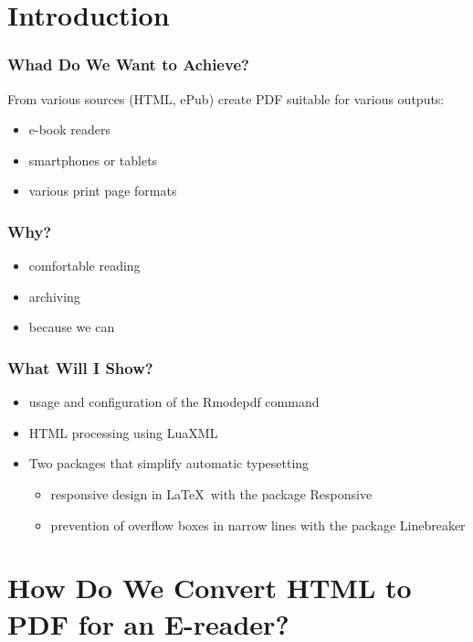\mode*
\section{Introduction}
\frenchspacing

\begin{frame}
  \frametitle{Whad Do We Want to Achieve?}
    From various sources (HTML, ePub) create PDF suitable for various outputs:
    \begin{itemize} 
      \item e-book readers
      \item smartphones or tablets
      \item various print page formats
    \end{itemize}

  \end{frame}
  \begin{frame}
    \frametitle{Why?}

    \begin{itemize}
      \item comfortable reading
      \item archiving
      \item because we can
    \end{itemize}


\end{frame}

\begin{frame}[fragile]
  \frametitle{What Will I Show?}
  \begin{itemize}
    \item usage and configuration of the Rmodepdf command
    \item HTML processing using LuaXML
    \item Two packages that simplify automatic typesetting
      \begin{itemize}
        \item responsive design in \LaTeX\ with the package Responsive
        \item prevention of overflow boxes in narrow lines with the package Linebreaker
      \end{itemize}

  \end{itemize}

\end{frame}


\section{How Do We Convert HTML to PDF for an E-reader?}

